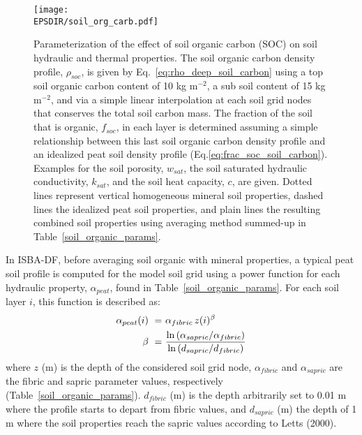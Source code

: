 \begin{figure}[!b]
\centerline{
\texttt{[image: \\EPSDIR/soil\_org\_carb.pdf]}}
\caption{Parameterization of the effect of soil organic carbon (SOC) on soil
hydraulic and thermal properties. The soil organic carbon density
profile, $\rho_{soc}$, is given by 
Eq.~\ref{eq:rho_deep_soil_carbon} 
using a top soil organic
carbon content of 10 kg m$^{-2}$, a sub soil content 
of 15 kg m$^{-2}$, and via
a simple linear interpolation at each soil grid nodes that conserves
the total soil carbon mass. The fraction of the soil that is organic,
$f_{soc}$, in each layer is determined assuming a simple relationship
between this last soil organic carbon density profile and an idealized
peat soil density profile 
(Eq.\ref{eq:frac_soc_soil_carbon}). 
Examples for the soil
porosity, $w_{sat}$, the soil saturated hydraulic conductivity, $k_{sat}$, and
the soil heat capacity, $c$, are given. Dotted lines represent vertical
homogeneous mineral soil properties, dashed lines the idealized peat
soil properties, and plain lines the resulting combined soil
properties using averaging method summed-up in Table~\ref{soil_organic_params}.}
\label{fig:soil_organic_carbon_profiles}
\end{figure}



In ISBA-DF, before averaging soil organic with mineral properties, a
typical peat soil profile is computed for the model soil grid using a
power function for each hydraulic property, $\alpha_{peat}$, found in 
Table~\ref{soil_organic_params}. 
For each soil layer $i$, this function is described as:
%
\begin{align}
\label{eq:alpha_peat_soil_carbon}
%
\alpha_{peat}(i) \,\,=&\,\, \alpha_{fibric} \, z(i)^\beta  
\\
\beta \,\,=&\,\,
\frac
{{\rm ln}\left( \alpha_{sapric} / \alpha_{fibric} \right)}
{{\rm ln}\left(d_{sapric} / d_{fibric} \right)}
%
\end{align}
%
where $z$ (m) is the depth of the considered soil grid node, $\alpha_{fibric}$ and
$\alpha_{sapric}$ are the fibric and sapric parameter values,
respectively (Table~\ref{soil_organic_params}). 
$d_{fibric}$ (m) is
the depth arbitrarily set to 0.01 m where the profile starts to depart
from fibric values, and $d_{sapric}$ (m) the depth of 1 m where the soil
properties reach the sapric values according to Letts \etal (2000)\nocite{Letts_ea_2000}.

